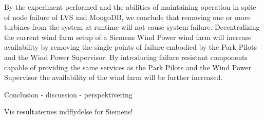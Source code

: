 By the experiment performed and the abilities of maintaining operation in spite of node failure of LVS and MongoDB, we conclude that removing one or more turbines from the system at runtime will not cause system failure. Decentralizing the current wind farm setup of a Siemens Wind Power wind farm will increase availability by removing the single points of failure embodied by the Park Pilots and the Wind Power Supervisor. By introducing failure resistant components capable of providing the same services as the Park Pilots and the Wind Power Supervisor the availability of the wind farm will be further increased.



Conclusion - discussion - perspektivering

Vis resultaternes indflydelse for Siemens!

